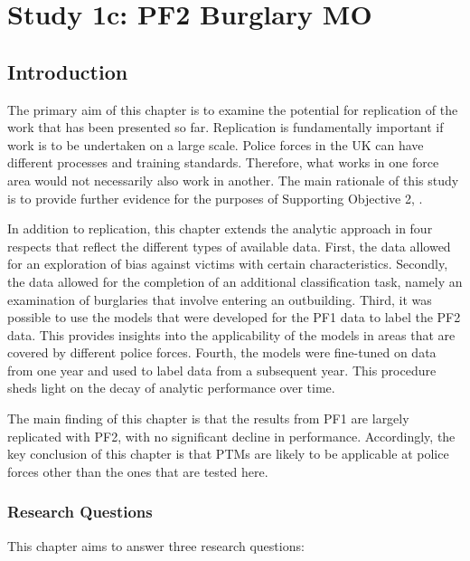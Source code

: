 \chapter{Study 1c: PF2 Burglary MO}

\section{Introduction} The primary aim of this chapter is to examine the potential for replication of the work that has been presented so far. Replication is fundamentally important if work is to be undertaken on a large scale. Police forces in the UK can have different processes and training standards. Therefore, what works in one force area would not necessarily also work in another. The main rationale of this study is to provide further evidence for the purposes of Supporting Objective 2, .
 
In addition to replication, this chapter extends the analytic approach in four respects that reflect the different types of available data. First, the data allowed for an exploration of bias against victims with certain characteristics. Secondly, the data allowed for the completion of an additional classification task, namely an examination of burglaries that involve entering an outbuilding. Third, it was possible to use the models that were developed for the PF1 data to label the PF2 data. This provides insights into the applicability of the models in areas that are covered by different police forces. Fourth, the models were fine-tuned on data from one year and used to label data from a subsequent year. This procedure sheds light on the decay of analytic performance over time.

The main finding of this chapter is that the results from PF1 are largely replicated with PF2, with no significant decline in performance. Accordingly, the key conclusion of this chapter is that PTMs are likely to be applicable at police forces other than the ones that are tested here.

\subsection{Research Questions} This chapter aims to answer three research questions:

